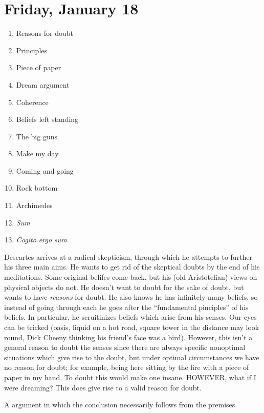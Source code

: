 
\section{Friday, January 18}

\begin{multicols}{2}
\begin{enumerate}
\item Reasons for doubt
\item Principles
\item Piece of paper
\item Dream argument
\item Coherence
\item Beliefs left standing
\item The big guns
\item Make my day
\item Coming and going
\item Rock bottom
\item Archimedes
\item \emph{Sum}
\item \emph{Cogito ergo sum}
\end{enumerate}
\end{multicols}

Descartes arrives at a radical skepticism, through which he attempts to further his three main aims. He wants to get rid of the skeptical doubts by the end of his meditations. Some original belifes come back, but his (old Aristotelian) views on physical objects do not. He doesn't want to doubt for the sake of doubt, but wants to have \emph{reasons} for doubt. He also knows he has infinitely many beliefs, so instead of going through each he goes after the ``fundamental pinciples'' of his beliefs. In particular, he scruitinizes beliefs which arise from his senses. Our eyes can be tricked (oasis, liquid on a hot road, square tower in the distance may look round, Dick Cheeny thinking his friend's face was a bird). However, this isn't a general reason to doubt the senses since there are always specific nonoptimal situations which give rise to the doubt, but under optimal circumstances we have no reason for doubt; for example, being here sitting by the fire with a piece of paper in my hand. To doubt this would make one insane. HOWEVER, what if I were dreaming? This does give rise to a valid reason for doubt.

\begin{definition}
A argument in which the conclusion necessarily follows from the premises.
\end{definition}

